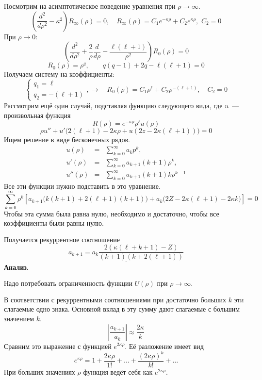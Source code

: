 Посмотрим на асимптотическое поведение уравнения при $\rho \to \infty$.
$$
    \left(
        \dfrac{d^2}{d \rho^2} - \kappa^2
    \right) R_{\infty} (\rho) = 0, \quad R_{\infty} (\rho) = C_1 e^{-\kappa \rho} + C_2 e^{\kappa \rho}, \,\, C_2 = 0
$$
При $\rho \to 0$:
$$
    \left(
        \dfrac{d^2}{d\rho^2} + \dfrac{2}{\rho} \dfrac{d}{d \rho} - \dfrac{\ell(\ell+1)}{\rho^2} 
    \right)R_0 (\rho) = 0
$$
$$
    R_0(\rho) = \rho^q, \qquad q(q-1) + 2q - \ell(\ell+1) = 0
$$
Получаем систему на коэффициенты:
$$
    \begin{cases}
        q_1 = \ell\\
        q_2 = - (\ell+1)
    \end{cases},
    \to \quad R_0(\rho) = C_1 \rho^\ell + C_2 \rho^{-(\ell+1)}, \quad C_2 = 0
$$
Рассмотрим ещё один случай, подставляя функцию следующего вида, где $u$~--- произвольная функция
$$
    R(\rho) = e^{-\kappa \rho} \rho^{\ell} u(\rho)
$$
$$
    \rho u'' + u' \big(
        2(\ell+1) - 2\kappa \rho + u(2z - 2 \kappa(\ell+1))
    \big) = 0
$$
Ищем решение в виде бесконечных рядов.
\begin{eqnarray}
    u(\rho) &=& \sum_{k=0}^{\infty} a_k p^k,\\
    u'(\rho) &=& \sum_{k=0}^{\infty} a_{k+1} (k+1) \rho^k,    \\
    u''(\rho) &=& \sum_{k=0}^{\infty} a_{k+1} (k+1) k \rho^{k-1}
\end{eqnarray}
Все эти функции нужно подставить в это уравнение.
$$
    \sum_{k=0}^\infty \rho^k
    \left[
        a_{k+1} \big( 
                        k(k+1)
                        + 2 (\ell + 1) (k+1)
                \big)
        + a_k \big(
                    2 Z - 2 \kappa (\ell+1) - 2\kappa k
              \big)
    \right] = 0
$$
Чтобы эта сумма была равна нулю, необходимо и достаточно, чтобы все коэффициенты были равны нулю.

Получается рекуррентное соотношение
$$
\underline{    a_{k+1} = a_k \dfrac
                    {2(\kappa (\ell + k + 1) - Z)}
                    {(k+1)( k+ 2 (\ell+1))}}
$$
\textbf{Анализ.} 

Надо потребовать ограниченность функции $U(\rho)$ при $\rho \to \infty$.

В соответствии с рекуррентными соотношениями при достаточно больших $k$ эти слагаемые одно знака. Основной вклад в эту сумму дают слагаемые с большим значением $k$.
$$
    \left|
    \dfrac{a_{k+1}}{a_k}
    \right| \approx \dfrac{2 \kappa}{k}
$$ 
Сравним это выражение с функцией $e^{2 \kappa \rho}$. Её разложение имеет вид
$$
    e^{\kappa \rho} = 1  + \dfrac{2 \kappa \rho}{1!} + \ldots + \dfrac{(2 \kappa \rho)^k}{k!} + \ldots
$$
При больших значениях $\rho$ функция ведёт себя как $e^{2 \kappa \rho}$.

